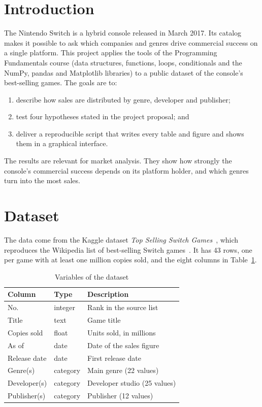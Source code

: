 \documentclass[conference]{IEEEtran}
\begin{document}
\section{Introduction}
The Nintendo Switch is a hybrid console released in March 2017. Its catalog makes it possible to ask which companies and genres drive commercial success on a single platform. This project applies the tools of the Programming Fundamentals course (data structures, functions, loops, conditionals and the NumPy, pandas and Matplotlib libraries) to a public dataset of the console's best-selling games. The goals are to:
\begin{enumerate}
  \item describe how sales are distributed by genre, developer and publisher;
  \item test four hypotheses stated in the project proposal; and
  \item deliver a reproducible script that writes every table and figure and shows them in a graphical interface.
\end{enumerate}

The results are relevant for market analysis. They show how strongly the console's commercial success depends on its platform holder, and which genres turn into the most sales.

\section{Dataset}
The data come from the Kaggle dataset \emph{Top Selling Switch Games}~\cite{kaggle}, which reproduces the Wikipedia list of best-selling Switch games~\cite{wiki}. It has 43 rows, one per game with at least one million copies sold, and the eight columns in Table~\ref{tab:vars}.

\begin{table}[!t]
\caption{Variables of the dataset}
\label{tab:vars}
\centering
\footnotesize
\begin{tabular}{@{}lll@{}}
\toprule
Column & Type & Description \\
\midrule
No. & integer & Rank in the source list \\
Title & text & Game title \\
Copies sold & float & Units sold, in millions \\
As of & date & Date of the sales figure \\
Release date & date & First release date \\
Genre(s) & category & Main genre (22 values) \\
Developer(s) & category & Developer studio (25 values) \\
Publisher(s) & category & Publisher (12 values) \\
\bottomrule
\end{tabular}
\end{table}
\end{document}

